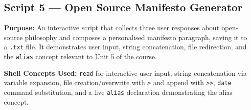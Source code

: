 \subsection{Script 5 — Open Source Manifesto Generator}

\textbf{Purpose:} An interactive script that collects three user responses about open-source
philosophy and composes a personalised manifesto paragraph, saving it to a \texttt{.txt}
file. It demonstrates user input, string concatenation, file redirection, and the
\texttt{alias} concept relevant to Unit 5 of the course.

\textbf{Shell Concepts Used:} \texttt{read} for interactive user input, string concatenation
via variable expansion, file creation/overwrite with \texttt{>} and append with \texttt{>>},
\texttt{date} command substitution, and a live \texttt{alias} declaration demonstrating
the alias concept.

